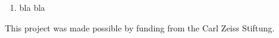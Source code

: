 \documentclass{aa}
\begin{document}



   \begin{enumerate}
      \item bla bla
      \end{enumerate}


\begin{acknowledgements}
      This project was made possible by funding from the Carl Zeiss Stiftung.
\end{acknowledgements}

%
%






\end{document}
